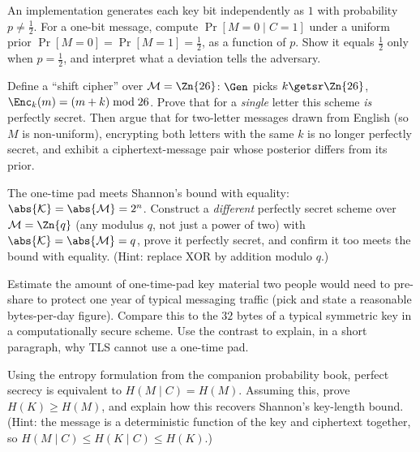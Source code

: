 \begin{exercise}
\label{ch09:ex-bias}
An implementation generates each key bit independently as $1$ with probability $p \ne \tfrac12$. For a one-bit message, compute $\Pr[M=0 \mid C=1]$ under a uniform prior $\Pr[M=0]=\Pr[M=1]=\tfrac12$, as a function of $p$. Show it equals $\tfrac12$ only when $p=\tfrac12$, and interpret what a deviation tells the adversary.
\end{exercise}

\begin{exercise}
\label{ch09:ex-notperfect}
Define a ``shift cipher'' over $\mathcal{M}=\Zn{26}$: $\Gen$ picks $k \getsr \Zn{26}$, $\Enc_k(m) = (m+k) \bmod 26$. Prove that for a \emph{single} letter this scheme \emph{is} perfectly secret. Then argue that for two-letter messages drawn from English (so $M$ is non-uniform), encrypting both letters with the same $k$ is no longer perfectly secret, and exhibit a ciphertext-message pair whose posterior differs from its prior.
\end{exercise}

\begin{exercise}
\label{ch09:ex-tight}
The one-time pad meets Shannon's bound with equality: $\abs{\mathcal{K}} = \abs{\mathcal{M}} = 2^n$. Construct a \emph{different} perfectly secret scheme over $\mathcal{M} = \Zn{q}$ (any modulus $q$, not just a power of two) with $\abs{\mathcal{K}} = \abs{\mathcal{M}} = q$, prove it perfectly secret, and confirm it too meets the bound with equality. (Hint: replace XOR by addition modulo $q$.)
\end{exercise}

\begin{exercise}
\label{ch09:ex-presharing}
Estimate the amount of one-time-pad key material two people would need to pre-share to protect one year of typical messaging traffic (pick and state a reasonable bytes-per-day figure). Compare this to the $32$ bytes of a typical symmetric key in a computationally secure scheme. Use the contrast to explain, in a short paragraph, why TLS cannot use a one-time pad.
\end{exercise}

\begin{exercise}
\label{ch09:ex-entropy}
Using the entropy formulation from the companion probability book, perfect secrecy is equivalent to $H(M \mid C) = H(M)$. Assuming this, prove $H(K) \ge H(M)$, and explain how this recovers Shannon's key-length bound. (Hint: the message is a deterministic function of the key and ciphertext together, so $H(M \mid C) \le H(K \mid C) \le H(K)$.)
\end{exercise}


